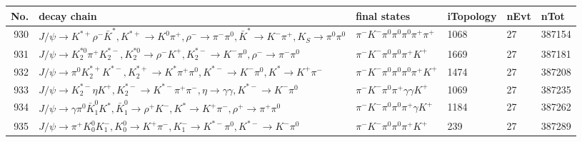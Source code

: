 \begin{table}[htbp] 
\begin{center}
\begin{small}
\begin{tabular}{rlllll}\hline\hline
 No. & decay chain & final states &  iTopology & nEvt & nTot \\\hline
930&$J/\psi       \rightarrow K^{*+}         \rho^{-}      \bar{K}^{*}   , K^{*+}          \rightarrow K^{0}          \pi^{+}        , \rho^{-}       \rightarrow \pi^{-}        \pi^{0}        , \bar{K}^{*}    \rightarrow K^{-}          \pi^{+}        , K_{S}           \rightarrow \pi^{0}        \pi^{0}        $&$\pi^{-}        K^{-}          \pi^{0}        \pi^{0}        \pi^{0}        \pi^{+}        \pi^{+}        $& 1068&   27&387154\\
931&$J/\psi       \rightarrow K_2^{*0}       \pi^{+}        K_2^{*-}       , K_2^{*0}        \rightarrow \rho^{-}      K^{+}          , K_2^{*-}        \rightarrow K^{-}          \pi^{0}        , \rho^{-}       \rightarrow \pi^{-}        \pi^{0}        $&$\pi^{-}        K^{-}          \pi^{0}        \pi^{0}        \pi^{+}        K^{+}          $& 1669&   27&387181\\
932&$J/\psi       \rightarrow \pi^{0}        K_2^{*+}       K^{*-}         , K_2^{*+}        \rightarrow K^{*}          \pi^{+}        \pi^{0}        , K^{*-}          \rightarrow K^{-}          \pi^{0}        , K^{*}           \rightarrow K^{+}          \pi^{-}        $&$\pi^{-}        K^{-}          \pi^{0}        \pi^{0}        \pi^{0}        \pi^{+}        K^{+}          $& 1474&   27&387208\\
933&$J/\psi       \rightarrow K_2^{*-}       \eta          K^{+}          , K_2^{*-}        \rightarrow K^{*-}         \pi^{+}        \pi^{-}        , \eta           \rightarrow \gamma       \gamma       , K^{*-}          \rightarrow K^{-}          \pi^{0}        $&$\pi^{-}        K^{-}          \pi^{0}        \pi^{+}        \gamma       \gamma       K^{+}          $& 1069&   27&387235\\
934&$J/\psi       \rightarrow \gamma       \pi^{0}        \bar{K}_1^{0} K^{*}          , \bar{K}_1^{0}  \rightarrow \rho^{+}      K^{-}          , K^{*}           \rightarrow K^{+}          \pi^{-}        , \rho^{+}       \rightarrow \pi^{+}        \pi^{0}        $&$\pi^{-}        K^{-}          \pi^{0}        \pi^{0}        \pi^{+}        \gamma       K^{+}          $& 1184&   27&387262\\
935&$J/\psi       \rightarrow \pi^{+}        K_0^{0}        K_{1}^{-}      , K_0^{0}         \rightarrow K^{+}          \pi^{-}        , K_{1}^{-}       \rightarrow K^{*-}         \pi^{0}        , K^{*-}          \rightarrow K^{-}          \pi^{0}        $&$\pi^{-}        K^{-}          \pi^{0}        \pi^{0}        \pi^{+}        K^{+}          $&  239&   27&387289\\

\end{tabular}
\end{small}
\end{center}
\end{table}
